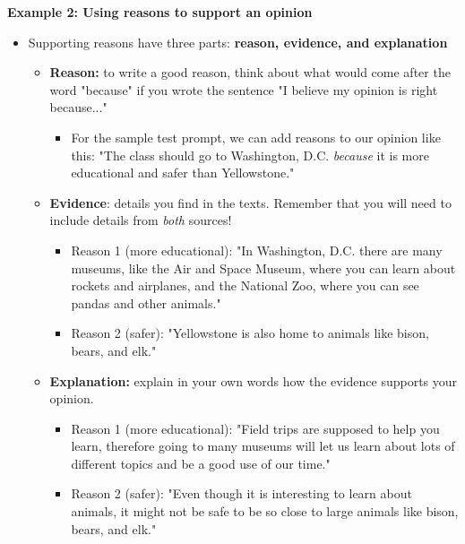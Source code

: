 \documentclass[12pt]{article}
\begin{document}
\begin{tcolorbox}[colframe=black!60, colback=white, 
coltitle=black, colbacktitle=black!15, fonttitle=\bfseries\Large, 
title=Examples, halign title=center, left=10pt, right=10pt, top=10pt, bottom=15pt]

\textbf{Example 2: Using reasons to support an opinion}
\begin{itemize}
    \item Supporting reasons have three parts: \textbf{reason, evidence, and explanation}
    \begin{itemize}
        \item \textbf{Reason:} to write a good reason, think about what would come after the word "because" if you wrote the sentence "I believe my opinion is right because..."
        \begin{itemize}
            \item For the sample test prompt, we can add reasons to our opinion like this: "The class should go to Washington, D.C. \textit{because} it is more educational and safer than Yellowstone."
        \end{itemize}
        \item \textbf{Evidence}: details you find in the texts. Remember that you will need to include details from \textit{both} sources!
        \begin{itemize}
            \item Reason 1 (more educational): "In Washington, D.C. there are many museums, like the Air and Space Museum, where you can learn about rockets and airplanes, and the National Zoo, where you can see pandas and other animals."
            \item Reason 2 (safer): "Yellowstone is also home to animals like bison, bears, and elk."
        \end{itemize}
        \item \textbf{Explanation:} explain in your own words how the evidence supports your opinion. 
        \begin{itemize}
            \item Reason 1 (more educational): "Field trips are supposed to help you learn, therefore going to many museums will let us learn about lots of different topics and be a good use of our time."
            \item Reason 2 (safer): "Even though it is interesting to learn about animals, it might not be safe to be so close to large animals like bison, bears, and elk."
        \end{itemize}
    \end{itemize}
        \end{itemize}


\end{tcolorbox}
\end{document}
